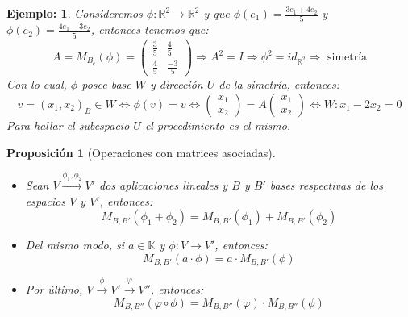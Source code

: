 \documentclass[10pt,a4paper,openright]{book}
\theoremstyle{break}
\newtheorem*{prop}{Proposición}
\newtheorem*{ej}{\underline{Ejemplo}:}
\begin{document}
\begin{ej}
Consideremos $\phi: \mathbb R^2 \longrightarrow \mathbb R^2$ y que $\phi(e_1)=\frac{3e_1+4e_2}{5}$ y $\phi(e_2)=\frac{4e_1-3e_2}{5}$, entonces tenemos que:
$$A=M_{B_c}(\phi)=\left(\begin{array}{cc} \frac{3}{5} & \frac{4}{5} \\ \frac{4}{5} & \frac{-3}{5}\end{array}\right)\Rightarrow A^2=I \Rightarrow \phi^2=id_{\mathbb R^2}\Rightarrow \mbox{ simetría}$$
Con lo cual, $\phi$ posee base $W$ y dirección $U$ de la simetría, entonces:
$$v=(x_1,x_2)_B\in W\Leftrightarrow \phi(v)=v\Leftrightarrow \begin{pmatrix}
x_1 \\
x_2
\end{pmatrix}=A\begin{pmatrix}
x_1\\
x_2
\end{pmatrix}\Leftrightarrow W: x_1-2x_2=0
$$
Para hallar el subespacio $U$ el procedimiento es el mismo.
\end{ej}

\begin{prop}[Operaciones con matrices asociadas]
\begin{itemize}
\item Sean $V\stackrel{\phi_1, \phi_2}{\longrightarrow} V'$ dos aplicaciones lineales y $B$ y $B'$ bases respectivas de los espacios $V$ y $V'$, entonces:
$$M_{B,B'}(\phi_1+\phi_2)=M_{B,B'}(\phi_1)+M_{B,B'}(\phi_2)$$

\item Del mismo modo, si $a\in \mathbb K$ y $\phi: V\longrightarrow V'$, entonces:
$$M_{B,B'}(a\cdot \phi)=a \cdot M_{B,B'}(\phi)$$

\item Por último, $V\stackrel{\phi}{\longrightarrow} V'\stackrel{\varphi}{\longrightarrow } V''$, entonces:
$$M_{B,B''}(\varphi\circ \phi)=M_{B,B''}(\varphi)\cdot M_{B,B''}(\phi)$$
\end{itemize}
\end{prop}
\end{document}
